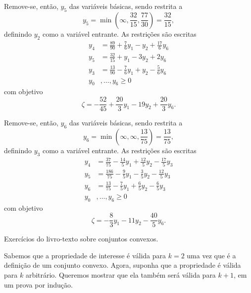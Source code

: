 \documentclass[a4paper]{report}
\begin{document}
Remove-se, então, $y_5$ das variáveis básicas, sendo restrita a \[
y_5 = \min\left( \infty, \frac{32}{15}, \frac{77}{30} \right) = \frac{32}{15}
,\] 
definindo $y_2$ como a variável entrante.
As restrições são escritas
\begin{align*}
    y_4 &= \frac{89}{90} +\frac{7}{6}y_1 -y_2 + \frac{17}{6}y_6 \\
    y_5 &= \frac{32}{15} + y_1 - 3y_2 + 2y_6 \\
    y_3 &= \frac{13}{90} -\frac{7}{6}y_1 + y_2 -\frac{5}{6}y_6 \\
    y_0&,\ldots,y_6 \ge 0
\end{align*}
com objetivo \[
    \zeta =-\frac{52}{45} +\frac{20}{3}y_1 -19y_2 +\frac{20}{3}y_6.\] 

Remove-se, então, $y_6$ das variáveis básicas, sendo restrita a \[
y_6 = \min\left( \infty, \infty, \frac{13}{75} \right) = \frac{13}{75}
,\] 
definindo $y_3$ como a variável entrante.
As restrições são escritas
\begin{align*}
    y_4 &= \frac{37}{75} -\frac{14}{5}y_1 +\frac{12}{5}y_2 - \frac{17}{5}y_3 \\
    y_5 &= \frac{186}{75} -\frac{9}{5}y_1 - \frac{3}{5}y_2 -\frac{12}{5}y_3 \\
    y_6 &= \frac{13}{75} -\frac{7}{5}y_1 + \frac{6}{5}y_2 -\frac{6}{5}y_3 \\
    y_0&,\ldots,y_6 \ge 0
\end{align*}
com objetivo \[
    \zeta =-\frac{8}{3}y_1 -11y_2 -\frac{40}{5}y_6.\] 





Exercícios do livro-texto sobre conjuntos convexos.


Sabemos que a propriedade de interesse é válida para $k=2$ uma vez que é a definição de um conjunto convexo.
Agora, suponha que a propriedade é válida para $k$ arbitrário.
Queremos mostrar que ela também será válida para $k+1$, em um prova por indução.
\end{document}
